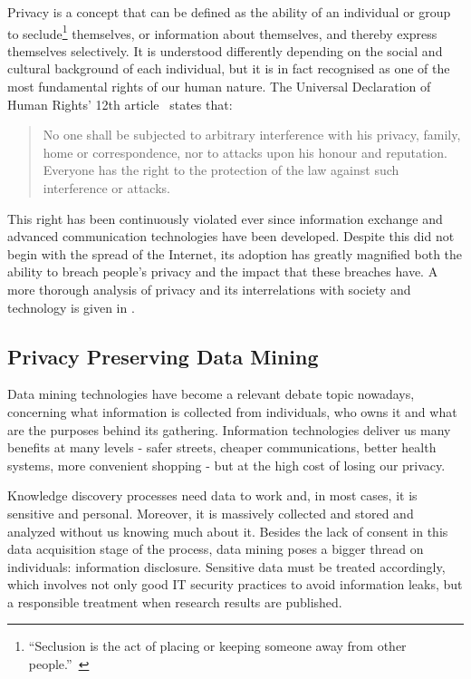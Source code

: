 Privacy is a concept that can be defined as the ability of an individual or group to
seclude\footnote{“Seclusion is the act of placing or keeping someone away from other people.”~\citep{web:Merriam:Seclusion}} themselves, or information about themselves, and
thereby express themselves selectively. It is understood differently depending on the social
and cultural background of each individual, but it is in fact recognised as one of the most
fundamental rights of our human nature. The Universal Declaration of Human Rights’ 12th
article~\citep{web:UN:HumanRightsDeclaration} states that:

\begin{quote}
	No one shall be subjected to arbitrary interference with his privacy, family, home or
	correspondence, nor to attacks upon his honour and reputation. Everyone has the right to
	the protection of the law against such interference or attacks.
\end{quote}

This right has been continuously violated ever since information exchange and advanced
communication technologies have been developed. Despite this did not begin with the spread
of the Internet, its adoption has greatly magnified both the ability to breach people’s privacy
and the impact that these breaches have. A more thorough analysis of privacy and its interrelations
with society and technology is given in .

\subsection{Privacy Preserving Data Mining}
\label{Introduction::Context::PPSM}

Data mining technologies have become a relevant debate topic nowadays, concerning what
information is collected from individuals, who owns it and what are the purposes behind
its gathering. Information technologies deliver us many benefits at many levels - safer
streets, cheaper communications, better health systems, more convenient shopping - but
at the high cost of losing our privacy.

Knowledge discovery processes need data to work and, in most cases, it is sensitive and
personal. Moreover, it is massively collected and stored and analyzed without us knowing
much about it. Besides the lack of consent in this data acquisition stage of the process,
data mining poses a bigger thread on individuals: information disclosure. Sensitive data
must be treated accordingly, which involves not only good IT security practices to avoid
information leaks, but a responsible treatment when research results are published.

